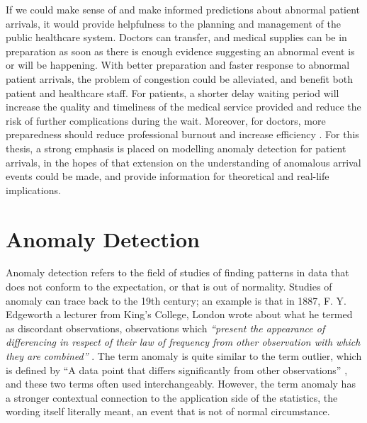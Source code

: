 \newpara

If we could make sense of and make informed predictions about abnormal patient arrivals, it would provide helpfulness to the planning and management of the public healthcare system. Doctors can transfer, and medical supplies can be in preparation as soon as there is enough evidence suggesting an abnormal event is or will be happening. With better preparation and faster response to abnormal patient arrivals, the problem of congestion could be alleviated, and benefit both patient and healthcare staff. For patients, a shorter delay waiting period will increase the quality and timeliness of the medical service provided and reduce the risk of further complications during the wait. Moreover, for doctors, more preparedness should reduce professional burnout and increase efficiency \citep{chambers2016burnout, khare2009adding}. For this thesis, a strong emphasis is placed on modelling anomaly detection for patient arrivals, in the hopes of that extension on the understanding of anomalous arrival events could be made, and provide information for theoretical and real-life implications. 


\section{Anomaly Detection} \label{chap:anom}

Anomaly detection refers to the field of studies of finding patterns in data that does not conform to the expectation, or that is out of normality. Studies of anomaly can trace back to the 19th century; an example is that in 1887, F. Y. Edgeworth a lecturer from King’s College, London wrote about what he termed as discordant observations, observations which \textit{“present the appearance of differencing in respect of their law of frequency from other observation with which they are combined”} \citep{edgeworth1887xli}. The term anomaly is quite similar to the term outlier, which is defined by “A data point that differs significantly from other observations” \citep{grubbs1969procedures}, and these two terms often used interchangeably. However, the term anomaly has a stronger contextual connection to the application side of the statistics, the wording itself literally meant, an event that is not of normal circumstance. 

\newpara


